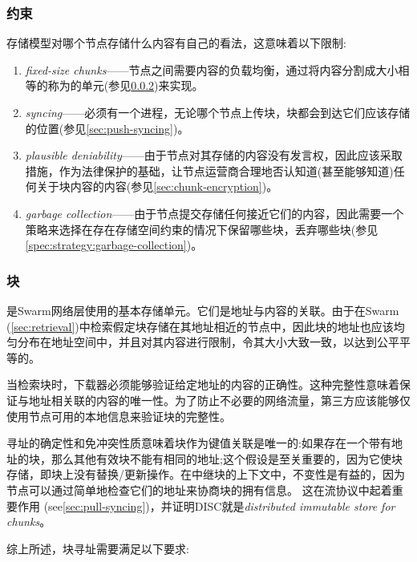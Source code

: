 \subsubsection{约束}
存储模型对哪个节点存储什么内容有自己的看法，这意味着以下限制: 

\begin{enumerate}
    \item \emph{fixed-size chunks}——节点之间需要内容的负载均衡，通过将内容分割成大小相等的称为的单元(参见\ref{sec:chunks})来实现。
    \item \emph{syncing}——必须有一个进程，无论哪个节点上传块，块都会到达它们应该存储的位置(参见\ref{sec:push-syncing})。
    \item \emph{plausible deniability}——由于节点对其存储的内容没有发言权，因此应该采取措施，作为法律保护的基础，让节点运营商合理地否认知道(甚至能够知道)任何关于块内容的内容(参见\ref{sec:chunk-encryption})。
    \item \emph{garbage collection}——由于节点提交存储任何接近它们的内容，因此需要一个策略来选择在存在存储空间约束的情况下保留哪些块，丢弃哪些块(参见\ref{spec:strategy:garbage-collection})。 
\end{enumerate}

\subsubsection{块}\label{sec:chunks}

是Swarm网络层使用的基本存储单元。它们是地址与内容的关联。由于在Swarm (\ref{sec:retrieval})中检索假定块存储在其地址相近的节点中，因此块的地址也应该均匀分布在地址空间中，并且对其内容进行限制，令其大小大致一致，以达到公平平等的。

当检索块时，下载器必须能够验证给定地址的内容的正确性。这种完整性意味着保证与地址相关联的内容的唯一性。为了防止不必要的网络流量，第三方应该能够仅使用节点可用的本地信息来验证块的完整性。

寻址的确定性和免冲突性质意味着块作为键值关联是唯一的:如果存在一个带有地址的块，那么其他有效块不能有相同的地址;这个假设是至关重要的，因为它使块存储，即块上没有替换/更新操作。在中继块的上下文中，不变性是有益的，因为节点可以通过简单地检查它们的地址来协商块的拥有信息。 这在流协议中起着重要作用 (see\ref{sec:pull-syncing})，并证明DISC就是\emph{distributed immutable store for chunks}。

综上所述，块寻址需要满足以下要求:

